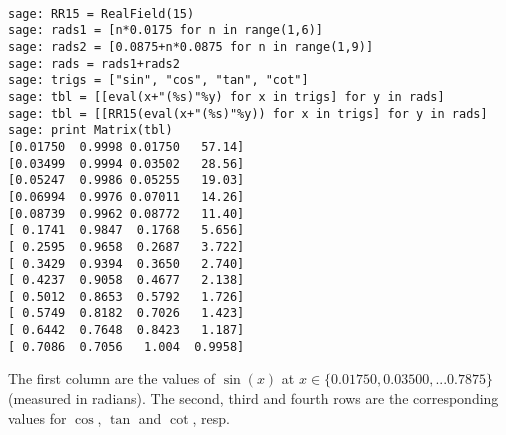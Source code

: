 \begin{Verbatim}[fontsize=\scriptsize,fontfamily=courier,fontshape=tt,frame=single,label=\sage]

sage: RR15 = RealField(15)
sage: rads1 = [n*0.0175 for n in range(1,6)]
sage: rads2 = [0.0875+n*0.0875 for n in range(1,9)]
sage: rads = rads1+rads2
sage: trigs = ["sin", "cos", "tan", "cot"]
sage: tbl = [[eval(x+"(%s)"%y) for x in trigs] for y in rads]
sage: tbl = [[RR15(eval(x+"(%s)"%y)) for x in trigs] for y in rads]
sage: print Matrix(tbl)
[0.01750  0.9998 0.01750   57.14]
[0.03499  0.9994 0.03502   28.56]
[0.05247  0.9986 0.05255   19.03]
[0.06994  0.9976 0.07011   14.26]
[0.08739  0.9962 0.08772   11.40]
[ 0.1741  0.9847  0.1768   5.656]
[ 0.2595  0.9658  0.2687   3.722]
[ 0.3429  0.9394  0.3650   2.740]
[ 0.4237  0.9058  0.4677   2.138]
[ 0.5012  0.8653  0.5792   1.726]
[ 0.5749  0.8182  0.7026   1.423]
[ 0.6442  0.7648  0.8423   1.187]
[ 0.7086  0.7056   1.004  0.9958]

\end{Verbatim}

\noindent
The first column are the values of $\sin(x)$ at 
$x\in \{0.01750, 0.03500, ... %
0.7875\}$ (measured in radians). The second, third and fourth 
rows are the corresponding values for $\cos$, $\tan$ and $\cot$,
resp.

